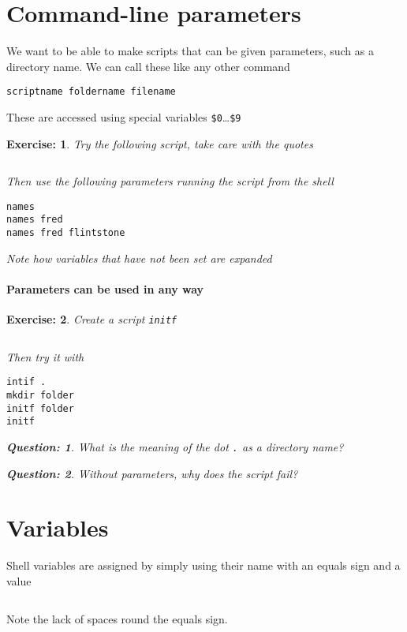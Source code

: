 \documentclass{article}
\newtheorem{exercise}{Exercise:}
\newtheorem{question}{Question:}
\begin{document}
\section{Command-line parameters }
We want to be able to make scripts that can be given parameters, such
as a directory name.  We can call these like any other command
\begin{verbatim}
scriptname foldername filename
\end{verbatim}
These are accessed using special variables
\texttt{\$0}\ldots\texttt{\$9}
\begin{exercise}
  Try the following script, take care with the quotes
  \inputminted[label=ascript,frame=leftline,rulecolor=\color{Green},framerule=3pt]{bash}{scripts/name}
Then use the following parameters running the script from the shell
\begin{verbatim}
names
names fred
names fred flintstone
\end{verbatim}
Note how variables that have not been set are expanded
\end{exercise}

\paragraph{Parameters can be used in any way}
\begin{exercise}Create a script \texttt{initf}
    \inputminted[label=ascript,frame=leftline,rulecolor=\color{Green},framerule=3pt]{bash}{scripts/initf}
Then try it with
\begin{verbatim}
intif .
mkdir folder
initf folder
initf
\end{verbatim}
\begin{question}
  What is the meaning of the dot \texttt{.} as a directory name?
\end{question}
\begin{question}
  Without parameters, why does the script fail?
\end{question}
\end{exercise}

\section{Variables}
Shell variables are assigned by simply using their name with an equals
sign and a value
\inputminted[frame=leftline,rulecolor=\color{Navy},framerule=1pt]{console}{scripts/vareg}
Note the lack of spaces round the equals sign.
\end{document}
